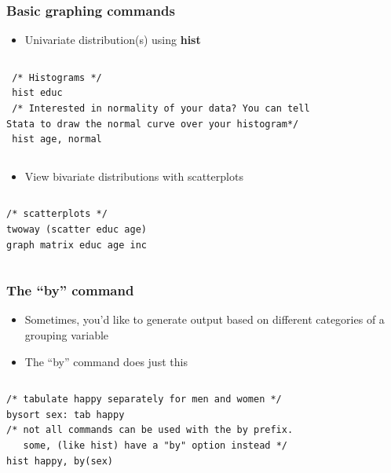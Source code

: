 \documentclass[table]{beamer}
\begin{document}
\begin{frame}[fragile]
\frametitle{Basic graphing commands}
\label{sec-3-2}

\begin{itemize}
\item Univariate distribution(s) using \textbf{hist}
\end{itemize}
\vspace{-.5em} \begin{columns}  \begin{block}{}

\begin{verbatim}
 /* Histograms */
 hist educ
 /* Interested in normality of your data? You can tell
Stata to draw the normal curve over your histogram*/
 hist age, normal
\end{verbatim}
\end{block} \end{columns}

\begin{itemize}
\item View bivariate distributions with scatterplots
\end{itemize}
\vspace{-.5em} \begin{columns}  \begin{block}{}

\begin{verbatim}
/* scatterplots */
twoway (scatter educ age)
graph matrix educ age inc
\end{verbatim}
\end{block} \end{columns}
\end{frame}
\begin{frame}[fragile]
\frametitle{The ``by'' command}
\label{sec-3-3}

\begin{itemize}
\item Sometimes, you'd like to generate  output based on different categories of a grouping variable
\item The ``by'' command does just this
\end{itemize}

\vspace{-.5em} \begin{columns}  \begin{block}{}

\begin{verbatim}
/* tabulate happy separately for men and women */
bysort sex: tab happy
/* not all commands can be used with the by prefix.
   some, (like hist) have a "by" option instead */
hist happy, by(sex)
\end{verbatim}
\end{block} \end{columns}
\end{frame}
\end{document}
